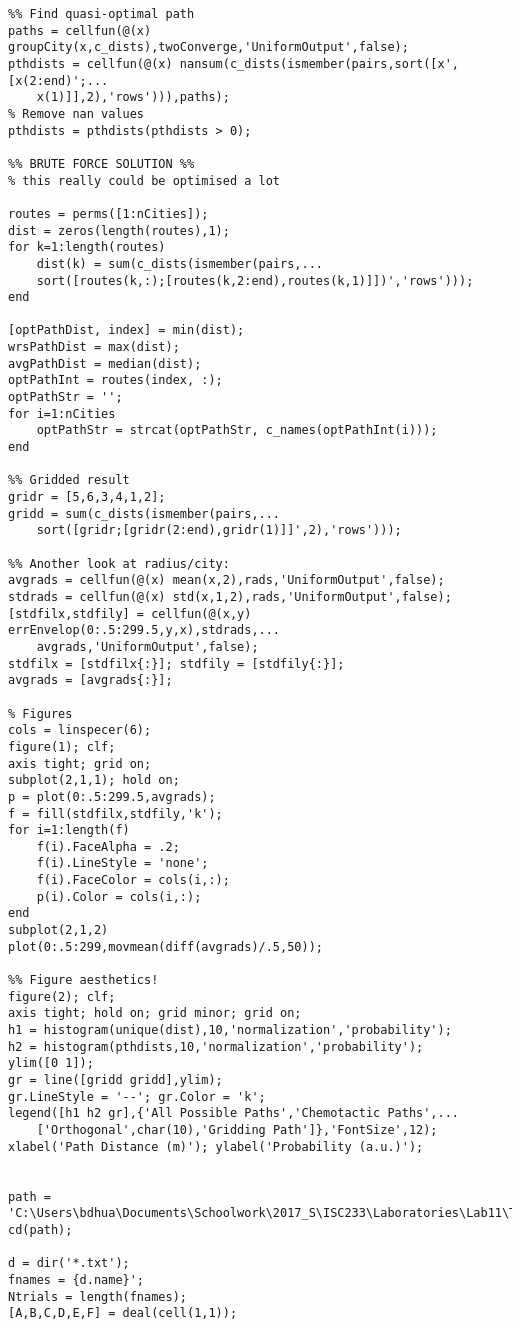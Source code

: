 \documentclass[10pt]{article}
\begin{document}
\begin{verbatim}
%% Find quasi-optimal path
paths = cellfun(@(x) groupCity(x,c_dists),twoConverge,'UniformOutput',false);
pthdists = cellfun(@(x) nansum(c_dists(ismember(pairs,sort([x',[x(2:end)';...
    x(1)]],2),'rows'))),paths);
% Remove nan values
pthdists = pthdists(pthdists > 0);

%% BRUTE FORCE SOLUTION %%
% this really could be optimised a lot

routes = perms([1:nCities]);
dist = zeros(length(routes),1);
for k=1:length(routes)
    dist(k) = sum(c_dists(ismember(pairs,...
    sort([routes(k,:);[routes(k,2:end),routes(k,1)]])','rows')));
end

[optPathDist, index] = min(dist);
wrsPathDist = max(dist);
avgPathDist = median(dist);
optPathInt = routes(index, :);
optPathStr = '';
for i=1:nCities
    optPathStr = strcat(optPathStr, c_names(optPathInt(i)));
end

%% Gridded result
gridr = [5,6,3,4,1,2];
gridd = sum(c_dists(ismember(pairs,...
    sort([gridr;[gridr(2:end),gridr(1)]]',2),'rows')));

%% Another look at radius/city:
avgrads = cellfun(@(x) mean(x,2),rads,'UniformOutput',false);
stdrads = cellfun(@(x) std(x,1,2),rads,'UniformOutput',false);
[stdfilx,stdfily] = cellfun(@(x,y) errEnvelop(0:.5:299.5,y,x),stdrads,...
    avgrads,'UniformOutput',false);
stdfilx = [stdfilx{:}]; stdfily = [stdfily{:}];
avgrads = [avgrads{:}];

% Figures
cols = linspecer(6);
figure(1); clf;
axis tight; grid on;
subplot(2,1,1); hold on;
p = plot(0:.5:299.5,avgrads);
f = fill(stdfilx,stdfily,'k');
for i=1:length(f)
    f(i).FaceAlpha = .2;
    f(i).LineStyle = 'none';
    f(i).FaceColor = cols(i,:);
    p(i).Color = cols(i,:);
end
subplot(2,1,2)
plot(0:.5:299,movmean(diff(avgrads)/.5,50));

%% Figure aesthetics!
figure(2); clf;
axis tight; hold on; grid minor; grid on;
h1 = histogram(unique(dist),10,'normalization','probability');
h2 = histogram(pthdists,10,'normalization','probability');
ylim([0 1]);
gr = line([gridd gridd],ylim);
gr.LineStyle = '--'; gr.Color = 'k';
legend([h1 h2 gr],{'All Possible Paths','Chemotactic Paths',...
    ['Orthogonal',char(10),'Gridding Path']},'FontSize',12);
xlabel('Path Distance (m)'); ylabel('Probability (a.u.)');


path = 'C:\Users\bdhua\Documents\Schoolwork\2017_S\ISC233\Laboratories\Lab11\Tracks\Tracks';
cd(path);

d = dir('*.txt');
fnames = {d.name}';
Ntrials = length(fnames);
[A,B,C,D,E,F] = deal(cell(1,1));


\end{verbatim}
\end{document}
